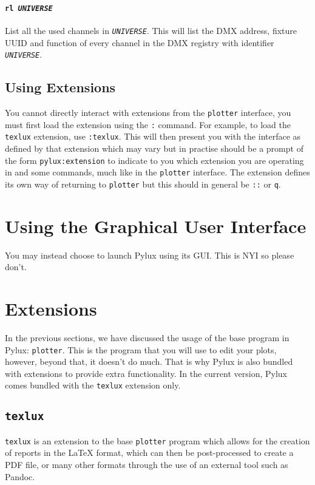 \documentclass[a4paper]{article}
\begin{document}
\paragraph{\texttt{rl \textit{UNIVERSE}}}
List all the used channels in \texttt{\textit{UNIVERSE}}. This will list the 
DMX address, fixture UUID and function of every channel in the DMX registry 
with identifier \texttt{\textit{UNIVERSE}}.

\subsection{Using Extensions}
You cannot directly interact with extensions from the \texttt{plotter} 
interface, you must first load the extension using the \texttt{:} command.
For example, to load the \texttt{texlux} extension, use \texttt{:texlux}. 
This will then present you with the interface as defined by that extension 
which may vary but in practise should be a prompt of the form 
\texttt{pylux:extension} to indicate to you which extension you are 
operating in and some commands, much like in the \texttt{plotter} interface.
The extension defines its own way of returning to \texttt{plotter} but this 
should in general be \texttt{::} or \texttt{q}.

\section{Using the Graphical User Interface}
You may instead choose to launch Pylux using its GUI. This is NYI so please 
don't.

\section{Extensions}
In the previous sections, we have discussed the usage of the base program in 
Pylux: \texttt{plotter}. This is the program that you will use to edit your
plots, however, beyond that, it doesn't do much. That is why Pylux is also 
bundled with extensions to provide extra functionality. In the current 
version, Pylux comes bundled with the \texttt{texlux} extension only.

\subsection{\texttt{texlux}}
\texttt{texlux} is an extension to the base \texttt{plotter} program which 
allows for the creation of reports in the \LaTeX{} format, which can then be 
post-processed to create a PDF file, or many other formats through the use of 
an external tool such as Pandoc.
\end{document}
